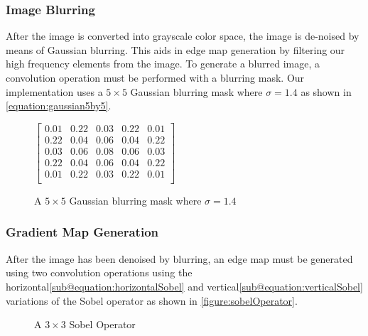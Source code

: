\documentclass[conference]{IEEEtran}
\begin{document}
\subsubsection{Image Blurring}
After the image is converted into grayscale color space, the image is de-noised by means of Gaussian blurring.
This aids in edge map generation by filtering our high frequency elements from the image.
To generate a blurred image, a convolution operation must be performed with a blurring mask. 
Our implementation uses a $5 \times 5$ Gaussian blurring mask where $\sigma = 1.4$ as shown in \autoref{equation:gaussian5by5}.
\begin{figure}[h] %
  \centering
  $\begin{bmatrix}
  0.01 & 0.22 & 0.03 & 0.22 & 0.01 \\
  0.22 & 0.04 & 0.06 & 0.04 & 0.22 \\
  0.03 & 0.06 & 0.08 & 0.06 & 0.03 \\
  0.22 & 0.04 & 0.06 & 0.04 & 0.22 \\
  0.01 & 0.22 & 0.03 & 0.22 & 0.01 \\
\end{bmatrix}$\caption{A $5 \times 5$ Gaussian blurring mask where $\sigma = 1.4$}\label{equation:gaussian5by5}
\end{figure}




\subsubsection{Gradient Map Generation}
After the image has been denoised by blurring, an edge map must be generated using two convolution operations using the horizontal\ref*{sub@equation:horizontalSobel} and  vertical\ref*{sub@equation:verticalSobel} variations of the Sobel operator as shown in \autoref{figure:sobelOperator}.
\begin{figure}[h] %
  \centering
  \hfil
  \caption{A $3 \times 3$ Sobel Operator}\label{figure:sobelOperator}
\end{figure}
\end{document}
